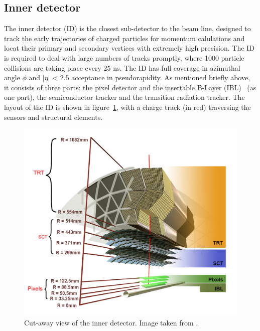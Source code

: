 \subsection{Inner detector}	
\label{sec:inner detector}
The inner detector (ID) is the closest sub-detector to the
beam line, designed to track the early trajectories of charged particles for
momentum calulations and locat their primary and secondary vertices with
extremely high precision. The ID is required to deal with large numbers of tracks
promptly, where 1000 particle collisions are taking place every 25 ns.  
The ID has full coverage in azimuthal angle $\phi$ and $|\eta|$ < 2.5 acceptance 
in pseudorapidity. As mentioned briefly above, it consists of three parts: 
the pixel detector and the insertable B-Layer (IBL)~\cite{ATLAS-TDR-19} (as one part),
the semiconductor tracker and the transition radiation
tracker. The layout of the ID is shown in figure~\ref{fig:inner_detector},
with a charge track (in red) traversing the sensors and structural elements. 
\begin{figure}[bht]
	\begin{centering}	
	\includegraphics[width=.85\textwidth]{Detector/plots/Inner detector.png}
	\caption{Cut-away view of the inner detector. Image taken from \cite{Pequenao}.}
	\label{fig:inner_detector}
\end{centering}
\end{figure}
